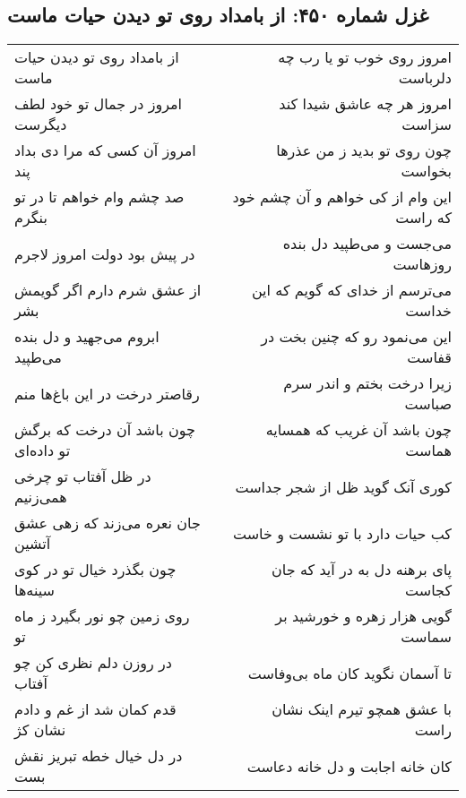 \begin{center}
\section*{غزل شماره ۴۵۰: از بامداد روی تو دیدن حیات ماست}
\label{sec:0450}
\begin{longtable}{l p{0.5cm} r}
از بامداد روی تو دیدن حیات ماست
&&
امروز روی خوب تو یا رب چه دلرباست
\\
امروز در جمال تو خود لطف دیگرست
&&
امروز هر چه عاشق شیدا کند سزاست
\\
امروز آن کسی که مرا دی بداد پند
&&
چون روی تو بدید ز من عذرها بخواست
\\
صد چشم وام خواهم تا در تو بنگرم
&&
این وام از کی خواهم و آن چشم خود که راست
\\
در پیش بود دولت امروز لاجرم
&&
می‌جست و می‌طپید دل بنده روزهاست
\\
از عشق شرم دارم اگر گویمش بشر
&&
می‌ترسم از خدای که گویم که این خداست
\\
ابروم می‌جهید و دل بنده می‌طپید
&&
این می‌نمود رو که چنین بخت در قفاست
\\
رقاصتر درخت در این باغ‌ها منم
&&
زیرا درخت بختم و اندر سرم صباست
\\
چون باشد آن درخت که برگش تو داده‌ای
&&
چون باشد آن غریب که همسایه هماست
\\
در ظل آفتاب تو چرخی همی‌زنیم
&&
کوری آنک گوید ظل از شجر جداست
\\
جان نعره می‌زند که زهی عشق آتشین
&&
کب حیات دارد با تو نشست و خاست
\\
چون بگذرد خیال تو در کوی سینه‌ها
&&
پای برهنه دل به در آید که جان کجاست
\\
روی زمین چو نور بگیرد ز ماه تو
&&
گویی هزار زهره و خورشید بر سماست
\\
در روزن دلم نظری کن چو آفتاب
&&
تا آسمان نگوید کان ماه بی‌وفاست
\\
قدم کمان شد از غم و دادم نشان کژ
&&
با عشق همچو تیرم اینک نشان راست
\\
در دل خیال خطه تبریز نقش بست
&&
کان خانه اجابت و دل خانه دعاست
\\
\end{longtable}
\end{center}
